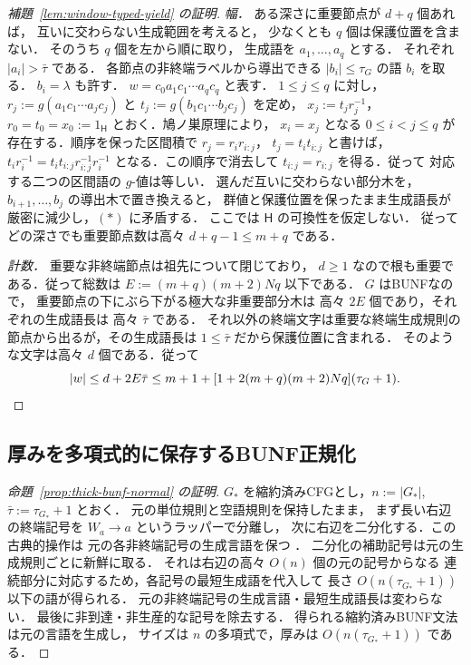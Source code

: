 \documentclass[11pt,a4paper]{ltjsarticle}
\theoremstyle{remark}
\theoremstyle{plain}
\begin{document}
\begin{proof}[補題~\ref{lem:window-typed-yield} の証明]
\emph{幅．}
ある深さに重要節点が $d+q$ 個あれば，
互いに交わらない生成範囲を考えると，
少なくとも $q$ 個は保護位置を含まない．
そのうち $q$ 個を左から順に取り，
生成語を $a_1,\ldots,a_q$ とする．
それぞれ $|a_i|>\bar\tau$ である．
各節点の非終端ラベルから導出できる
$|b_i|\le\tau_G$ の語 $b_i$ を取る．
$b_i=\lambda$ も許す．
$w=c_0a_1c_1\cdots a_qc_q$ と表す．
$1\le j\le q$ に対し，
$r_j:=g(a_1c_1\cdots a_jc_j)$ と
$t_j:=g(b_1c_1\cdots b_jc_j)$ を定め，
$x_j:=t_jr_j^{-1}$，$r_0=t_0=x_0:=1_{\mathsf H}$
とおく．鳩ノ巣原理により，
$x_i=x_j$ となる $0\le i<j\le q$
が存在する．順序を保った区間積で
$r_j=r_i r_{i:j}$，
$t_j=t_i t_{i:j}$ と書けば，
$t_i r_i^{-1}=t_i t_{i:j}r_{i:j}^{-1}r_i^{-1}$
となる．この順序で消去して
$t_{i:j}=r_{i:j}$ を得る．従って
対応する二つの区間語の $g$-値は等しい．
選んだ互いに交わらない部分木を，
$b_{i+1},\ldots,b_j$ の導出木で置き換えると，
群値と保護位置を保ったまま生成語長が
厳密に減少し，$(\ast)$ に矛盾する．
ここでは $\mathsf H$ の可換性を仮定しない．
従ってどの深さでも重要節点数は高々
$d+q-1\le m+q$ である．

\emph{計数．}
重要な非終端節点は祖先について閉じており，
$d\ge1$ なので根も重要である．従って総数は
$E:=(m+q)(m+2)Nq$ 以下である．
$G$ はBUNFなので，
重要節点の下にぶら下がる極大な非重要部分木は
高々 $2E$ 個であり，それぞれの生成語長は
高々 $\bar\tau$ である．
それ以外の終端文字は重要な終端生成規則の
節点から出るが，その生成語長は
$1\le\bar\tau$ だから保護位置に含まれる．
そのような文字は高々 $d$ 個である．従って
\[
|w|\le d+2E\bar\tau
\le m+1+
[1+2(m+q)(m+2)Nq](\tau_G+1).
\qedhere
\]
\end{proof}

\subsection{厚みを多項式的に保存するBUNF正規化}
\label{app:thick-bunf}
\begin{proof}[命題~\ref{prop:thick-bunf-normal} の証明]
$G_*$ を縮約済みCFGとし，$n:=|G_*|$,
$\bar\tau:=\tau_{G_*}+1$ とおく．
元の単位規則と空語規則を保持したまま，
まず長い右辺の終端記号を
$W_a\to a$ というラッパーで分離し，
次に右辺を二分化する．この古典的操作は
元の各非終端記号の生成言語を保つ
\cite[Section~3.1]{autebert1997}
\cite[Sections~7.1 and~7.4.2]{hopcroft-motwani-ullman2007}．
二分化の補助記号は元の生成規則ごとに新鮮に取る．
それは右辺の高々 $O(n)$ 個の元の記号からなる
連続部分に対応するため，各記号の最短生成語を代入して
長さ $O(n(\tau_{G_*}+1))$ 以下の語が得られる．
元の非終端記号の生成言語・最短生成語長は変わらない．
最後に非到達・非生産的な記号を除去する．
得られる縮約済みBUNF文法は元の言語を生成し，
サイズは $n$ の多項式で，厚みは
$O(n(\tau_{G_*}+1))$ である．
\end{proof}
\end{document}
